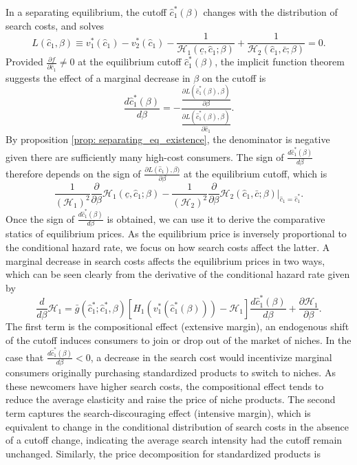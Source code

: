 \documentclass[14pt]{article}
\theoremstyle{plain}
\theoremstyle{definition}
\theoremstyle{remark}
\DeclareRobustCommand\1{\futurelet\oneNext\oneCheck}
\renewcommand{\H}{\mathcal{H}}
\begin{document}
In a separating equilibrium, the cutoff $\hat{c}_1^*(\beta)$ changes with the distribution of search costs, and solves 
\[
L(\hat{c}_1, \beta) \equiv v_1^*(\hat{c}_1)-v_2^*(\hat{c}_1)-\frac{1}{\H_1(\underline{c},\hat{c}_1;\beta)}+\frac{1}{\H_2(\hat{c}_1,\bar{c};\beta)}=0.
\]
Provided $\frac{\partial f}{\partial \hat{c}_1}\neq 0$ at the equilibrium cutoff $\hat{c}_1^*(\beta)$, the implicit function theorem suggests the effect of a marginal decrease in $\beta$ on the cutoff is 
\[
\frac{d\hat{c}_1^*(\beta)}{d \beta} = -\frac{\frac{\partial L(\hat{c}_1^*(\beta),\beta)}{\partial \beta }}{\frac{\partial L(\hat{c}_1^*(\beta),\beta)}{\partial \hat{c}_1 }}.
\]
By proposition \ref{prop: separating_eq_existence}, the denominator is negative given there are sufficiently many high-cost consumers. 
The sign of $\frac{d \hat{c}_1^*(\beta)}{d \beta}$ therefore depends on the sign of $\frac{\partial L(\hat{c}_1), \beta)}{\partial \beta}$ at the equilibrium cutoff, which is
\begin{equation}\label{eq:comparative_statics_cutoff}
\frac{1}{(\H_1)^2} \frac{\partial}{\partial \beta} \H_1(\underline{c},\hat{c}_1;\beta)
 - \frac{1}{(\H_2)^2} \frac{\partial}{\partial \beta} \H_2(\hat{c}_1,\bar{c};\beta) \bigg\vert_{\hat{c}_1 = \hat{c}_1^*}.
\end{equation}
Once the sign of $\frac{d \hat{c}_1^*(\beta)}{d \beta}$ is obtained, we can use it to derive the comparative statics of equilibrium prices. As the equilibrium price is inversely proportional to the conditional hazard rate, we focus on how search costs affect the latter. A marginal decrease in search costs affects the equilibrium prices in two ways, which can be seen clearly from the derivative of the conditional hazard rate given by
\begin{equation}\label{eq:comparative_P1}
\frac{d}{d \beta} \H_1 = \bar{g}(\hat{c}_1^*;\hat{c}_1^*,\beta) \left[H_1(v_1^*(\hat{c}_1^*(\beta)))-\H_1\right]\frac{d \hat{c}_1^*(\beta)}{d\beta} + \frac{\partial \H_1 }{\partial \beta}.
\end{equation}
The first term is the compositional effect (extensive margin), an endogenous shift of the cutoff induces consumers to join or drop out of the market of niches. In the case that $\frac{d \hat{c}_1^*(\beta)}{d\beta}<0$, a decrease in the search cost would incentivize marginal consumers originally purchasing standardized products to switch to niches. As these newcomers have higher search costs, the compositional effect tends to reduce the average elasticity and raise the price of niche products. The second term captures the search-discouraging effect (intensive margin), which is equivalent to change in the conditional distribution of search costs in the absence of a cutoff change, indicating the average search intensity had the cutoff remain unchanged. Similarly, the price decomposition for standardized products is 
\end{document}
